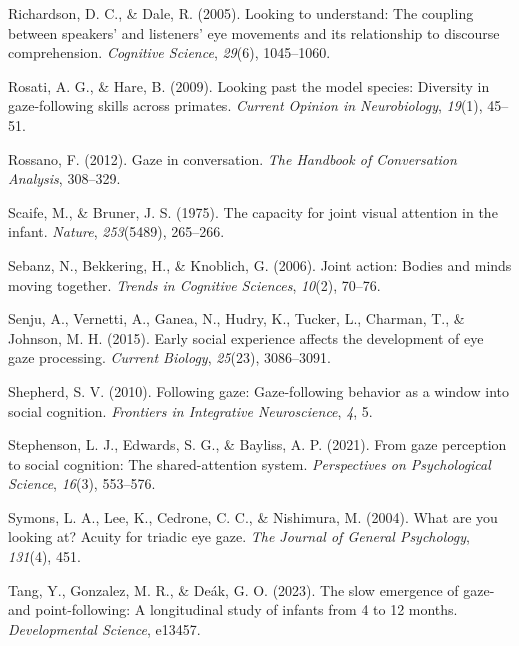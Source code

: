 \documentclass[
  man,floatsintext]{apa7}
\newlength{\cslhangindent}
\newlength{\cslentryspacingunit} %
\newenvironment{CSLReferences}[2] %
 {%
  \setlength{\parindent}{0pt}
  \ifodd #1
  \let\oldpar\par
  \def\par{\hangindent=\cslhangindent\oldpar}
  \fi
  \setlength{\parskip}{#2\cslentryspacingunit}
 }%
 {}
\begin{document}
\begin{CSLReferences}{1}{0}
\leavevmode{}%
Richardson, D. C., \& Dale, R. (2005). Looking to understand: The coupling between speakers' and listeners' eye movements and its relationship to discourse comprehension. \emph{Cognitive Science}, \emph{29}(6), 1045--1060.

\leavevmode{}%
Rosati, A. G., \& Hare, B. (2009). Looking past the model species: Diversity in gaze-following skills across primates. \emph{Current Opinion in Neurobiology}, \emph{19}(1), 45--51.

\leavevmode{}%
Rossano, F. (2012). Gaze in conversation. \emph{The Handbook of Conversation Analysis}, 308--329.

\leavevmode{}%
Scaife, M., \& Bruner, J. S. (1975). The capacity for joint visual attention in the infant. \emph{Nature}, \emph{253}(5489), 265--266.

\leavevmode{}%
Sebanz, N., Bekkering, H., \& Knoblich, G. (2006). Joint action: Bodies and minds moving together. \emph{Trends in Cognitive Sciences}, \emph{10}(2), 70--76.

\leavevmode{}%
Senju, A., Vernetti, A., Ganea, N., Hudry, K., Tucker, L., Charman, T., \& Johnson, M. H. (2015). Early social experience affects the development of eye gaze processing. \emph{Current Biology}, \emph{25}(23), 3086--3091.

\leavevmode{}%
Shepherd, S. V. (2010). Following gaze: Gaze-following behavior as a window into social cognition. \emph{Frontiers in Integrative Neuroscience}, \emph{4}, 5.

\leavevmode{}%
Stephenson, L. J., Edwards, S. G., \& Bayliss, A. P. (2021). From gaze perception to social cognition: The shared-attention system. \emph{Perspectives on Psychological Science}, \emph{16}(3), 553--576.

\leavevmode{}%
Symons, L. A., Lee, K., Cedrone, C. C., \& Nishimura, M. (2004). What are you looking at? Acuity for triadic eye gaze. \emph{The Journal of General Psychology}, \emph{131}(4), 451.

\leavevmode{}%
Tang, Y., Gonzalez, M. R., \& Deák, G. O. (2023). The slow emergence of gaze-and point-following: A longitudinal study of infants from 4 to 12 months. \emph{Developmental Science}, e13457.


\end{CSLReferences}
\end{document}
